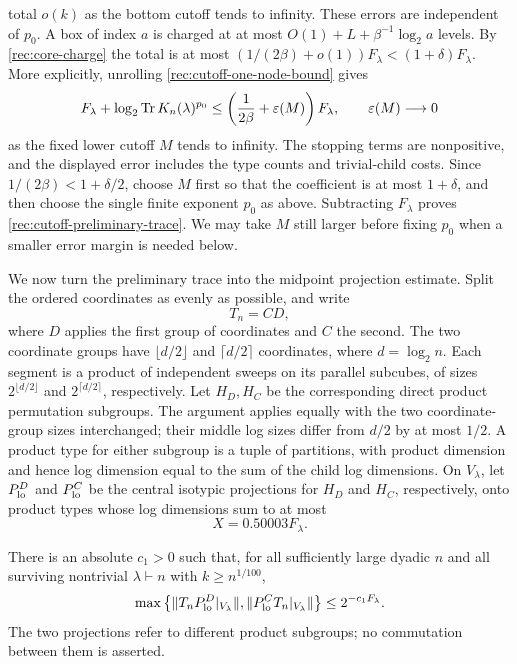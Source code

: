 total $o(k)$ as the bottom cutoff tends to infinity.  These errors
are independent of $p_0$.
A box of index $a$ is charged at at most
$O(1)+L+\beta^{-1}\log_2a$ levels.  By
\eqref{rec:core-charge} the total is at most
$(1/(2\beta)+o(1))F_\lambda<(1+\delta)F_\lambda$.
More explicitly, unrolling \eqref{rec:cutoff-one-node-bound} gives
\[
 F_\lambda+\log_2\operatorname{Tr} K_n(\lambda)^{p_0}
 \le \left(\frac1{2\beta}+\varepsilon(M)\right)F_\lambda,
 \qquad \varepsilon(M)\longrightarrow0
\]
as the fixed lower cutoff $M$ tends to infinity.  The stopping terms are
nonpositive, and the displayed error includes the type counts and
trivial-child costs.  Since $1/(2\beta)<1+\delta/2$, choose $M$ first
so that the coefficient is at most $1+\delta$, and then choose the
single finite exponent $p_0$ as above.  Subtracting $F_\lambda$ proves
\eqref{rec:cutoff-preliminary-trace}.  We may take $M$ still larger
before fixing $p_0$ when a smaller error margin is needed below.

We now turn the preliminary trace into the midpoint projection estimate.
Split the ordered coordinates as evenly as possible, and write
\[
 T_n=C D,
\]
where $D$ applies the first group of coordinates and $C$ the second.
The two coordinate groups have $\lfloor d/2\rfloor$ and
$\lceil d/2\rceil$ coordinates, where $d=\log_2n$.  Each segment
is a product of independent sweeps on its parallel subcubes, of sizes
$2^{\lfloor d/2\rfloor}$ and $2^{\lceil d/2\rceil}$, respectively.
Let $H_D,H_C$ be the corresponding direct product permutation subgroups.
The argument applies equally with the two coordinate-group sizes
interchanged; their middle log sizes differ from $d/2$ by at most $1/2$.
A product type for either subgroup is a tuple of partitions, with product
dimension and hence log dimension equal to the sum of the child log
dimensions.  On $V_\lambda$, let $P_{\rm lo}^D$ and $P_{\rm lo}^C$ be the
central isotypic projections for $H_D$ and $H_C$, respectively, onto
product types whose log dimensions sum to at most
\begin{equation}\label{rec:cutoff-X}
 X=0.50003F_\lambda.
\end{equation}
\begin{proposition}\label{rec:cutoff-midpoint}
There is an absolute $c_1>0$ such that, for all sufficiently large dyadic
$n$ and all surviving nontrivial $\lambda\vdash n$ with
$k\ge n^{1/100}$,
\begin{equation}\label{rec:cutoff-low-bound}
 \max\left\{\|T_nP_{\rm lo}^D|_{V_\lambda}\|,
              \|P_{\rm lo}^CT_n|_{V_\lambda}\|\right\}
 \le2^{-c_1F_\lambda}.
\end{equation}
The two projections refer to different product subgroups; no commutation
between them is asserted.
\end{proposition}

